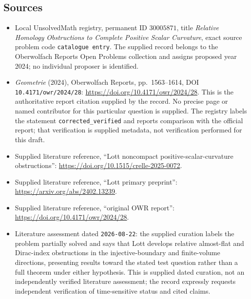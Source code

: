 \documentclass[11pt]{article}
\begin{document}
\subsection{Sources}
\begin{itemize}
\item Local UnsolvedMath registry, permanent ID \(30005871\), title \emph{Relative Homology Obstructions to Complete Positive Scalar Curvature}, exact source problem code \texttt{catalogue entry}. The supplied record belongs to the Oberwolfach Reports Open Problems collection and assigns proposed year 2024; no individual proposer is identified.
\item \emph{Geometrie} (2024), Oberwolfach Reports, pp.\ 1563--1614, DOI \texttt{10.4171/owr/2024/28}: \url{https://doi.org/10.4171/owr/2024/28}. This is the authoritative report citation supplied by the record. No precise page or named contributor for this particular question is supplied. The registry labels the statement \texttt{corrected\_verified} and reports comparison with the official report; that verification is supplied metadata, not verification performed for this draft.
\item Supplied literature reference, ``Lott noncompact positive-scalar-curvature obstructions'': \url{https://doi.org/10.1515/crelle-2025-0072}.
\item Supplied literature reference, ``Lott primary preprint'': \url{https://arxiv.org/abs/2402.13239}.
\item Supplied literature reference, ``original OWR report'': \url{https://doi.org/10.4171/owr/2024/28}.
\item Literature assessment dated \texttt{2026-08-22}: the supplied curation labels the problem partially solved and says that Lott develops relative almost-flat and Dirac-index obstructions in the injective-boundary and finite-volume directions, presenting results toward the stated test question rather than a full theorem under either hypothesis. This is supplied dated curation, not an independently verified literature assessment; the record expressly requests independent verification of time-sensitive status and cited claims.
\end{itemize}
\end{document}
